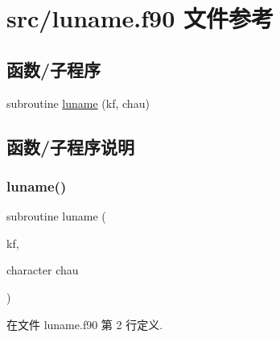 \hypertarget{luname_8f90}{}\section{src/luname.f90 文件参考}
\label{luname_8f90}
\subsection*{函数/子程序}
\begin{DoxyCompactItemize}
\item 
subroutine \mbox{\hyperlink{luname_8f90_ad024c8c10ed2b39e9271e84f0cd51326}{luname}} (kf, chau)
\end{DoxyCompactItemize}


\subsection{函数/子程序说明}
\mbox{\label{luname_8f90_ad024c8c10ed2b39e9271e84f0cd51326}} 
\subsubsection{\texorpdfstring{luname()}{luname()}}
{\footnotesize\ttfamily subroutine luname (\begin{DoxyParamCaption}\item[{}]{kf,  }\item[{character}]{chau }\end{DoxyParamCaption})}



在文件 luname.\+f90 第 2 行定义.

